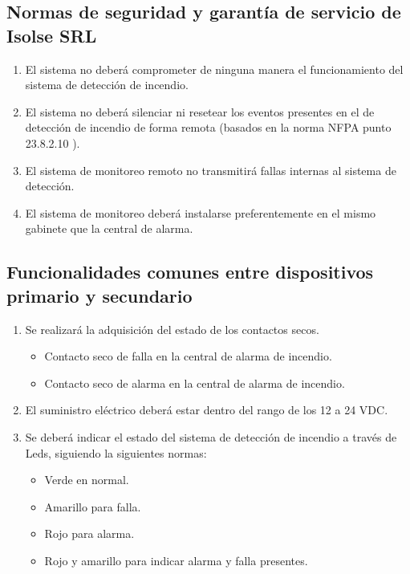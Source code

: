 \subsection{Normas de seguridad y garantía de servicio de Isolse SRL}
	\begin{enumerate}
	\item El sistema no deberá comprometer de ninguna manera el funcionamiento del sistema de detección de incendio.
	\item El sistema no deberá silenciar ni resetear los eventos presentes en el de detección de incendio de forma remota (basados en la norma NFPA punto 23.8.2.10 \cite{nfpa}). 
	\item El sistema de monitoreo remoto no transmitirá fallas internas al sistema de detección.
	\item El sistema de monitoreo deberá instalarse preferentemente en el mismo gabinete que la central de alarma.
	\end{enumerate}
	
\subsection{Funcionalidades comunes entre dispositivos primario y secundario}
	\begin{enumerate}
	\item Se realizará la adquisición del estado de los contactos secos.
		\begin{itemize}
		\item Contacto seco de falla en la central de alarma de incendio.
		\item Contacto seco de alarma en la central de alarma de incendio.
		\end{itemize}
	\item El suministro eléctrico deberá estar dentro del rango de los 12 a 24 VDC.
	\item Se deberá indicar el estado del sistema de detección de incendio a través de Leds, siguiendo la siguientes normas:
		\begin{itemize}
		\item  Verde en normal.
		\item  Amarillo para falla.
		\item  Rojo para alarma.
		\item   Rojo y amarillo para indicar alarma y falla presentes.				
		\end{itemize}
	\end{enumerate}
	
